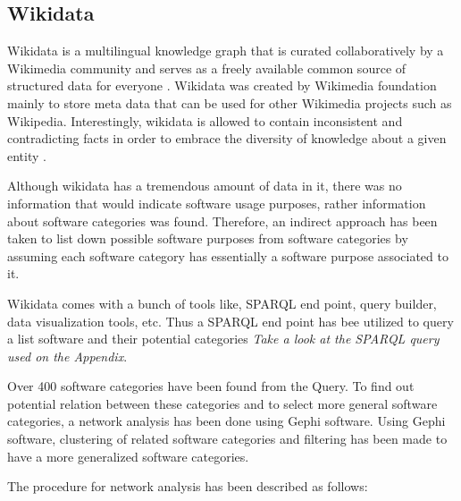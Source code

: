 \subsection{Wikidata}
Wikidata is a multilingual knowledge graph that is curated collaboratively by a Wikimedia community and serves as a freely available common source of structured data for everyone \citep{enwiki:1060114687, enwiki:1060408581}. 
Wikidata was created by Wikimedia foundation mainly to store meta data that can be used for other Wikimedia projects such as Wikipedia. Interestingly, wikidata is allowed to contain inconsistent and contradicting facts in order to embrace the diversity of knowledge about a given entity \citep{vrandevcic2012wikidata}. 

Although wikidata has a tremendous amount of data in it, there was no information that would indicate software usage purposes, rather information about software categories was found. Therefore, an indirect approach has been taken to list down possible software purposes from software categories by assuming each software category has essentially a software purpose associated to it. 

Wikidata comes with a bunch of tools like, SPARQL end point, query builder, data visualization tools, etc. Thus a SPARQL end point has bee utilized  to query a list software and their potential categories \emph{Take a look at the SPARQL query used on the Appendix}. 

Over 400 software categories have been found from the Query. To find out potential relation between these categories and to select more general software categories, a network analysis has been done using Gephi software.  Using Gephi software, clustering of related software categories and filtering has been made to have a more generalized software categories.

The procedure for network analysis has been described as follows:

